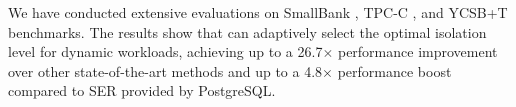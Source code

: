 We have conducted extensive evaluations on SmallBank \cite{DBLP:conf/icde/AlomariCFR08}, TPC-C \cite{TPCC}, and YCSB+T \cite{DBLP:conf/cloud/CooperSTRS10} benchmarks. The results show that \sysname can adaptively select the optimal isolation level for dynamic workloads, achieving up to a 26.7$\times$ performance improvement over other state-of-the-art methods and up to a 4.8$\times$ performance boost compared to SER provided by PostgreSQL.






